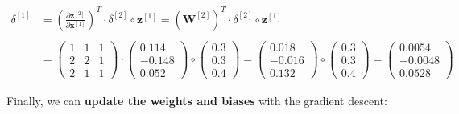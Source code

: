 \documentclass[12pt]{article}
\begin{document}
\begin{enumerate}
\begin{equation*}
    \begin{aligned}
        \delta^{[1]} &= \left(\frac{\partial \mathbf{z}^{[2]}}{\partial \mathbf{x}^{[1]}}\right)^T \cdot \delta^{[2]} \circ \mathbf{z}^{[1]} = \left(\mathbf{W}^{[2]}\right)^T \cdot \delta^{[2]} \circ \mathbf{z}^{[1]}\\
        \\
        &= \begin{pmatrix}
            1 & 1 & 1\\
            2 & 2 & 1\\
            2 & 1 & 1
        \end{pmatrix} \cdot \begin{pmatrix}
            0.114 \\
            -0.148 \\
            0.052
        \end{pmatrix} \circ \begin{pmatrix}
            0.3\\
            0.3\\
            0.4
        \end{pmatrix} = \begin{pmatrix}
            0.018 \\
            -0.016 \\
            0.132 
        \end{pmatrix} \circ \begin{pmatrix}
            0.3\\
            0.3\\
            0.4
        \end{pmatrix} = \begin{pmatrix}
            0.0054 \\
            -0.0048 \\
            0.0528
        \end{pmatrix}
    \end{aligned}
\end{equation*}

\vspace{10pt}
Finally, we can \textbf{update the weights and biases} with the gradient descent:


\end{enumerate}
\end{document}
